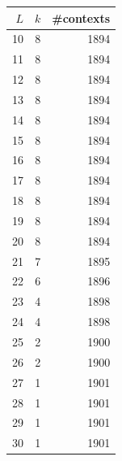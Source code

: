 \begin{tabular}{rrr}%
\hline%
$L$&$k$&\#contexts\\%
\hline%
10&8&1894\\%
11&8&1894\\%
12&8&1894\\%
13&8&1894\\%
14&8&1894\\%
15&8&1894\\%
16&8&1894\\%
17&8&1894\\%
18&8&1894\\%
19&8&1894\\%
20&8&1894\\%
21&7&1895\\%
22&6&1896\\%
23&4&1898\\%
24&4&1898\\%
25&2&1900\\%
26&2&1900\\%
27&1&1901\\%
28&1&1901\\%
29&1&1901\\%
30&1&1901\\%
\hline%
\end{tabular}
